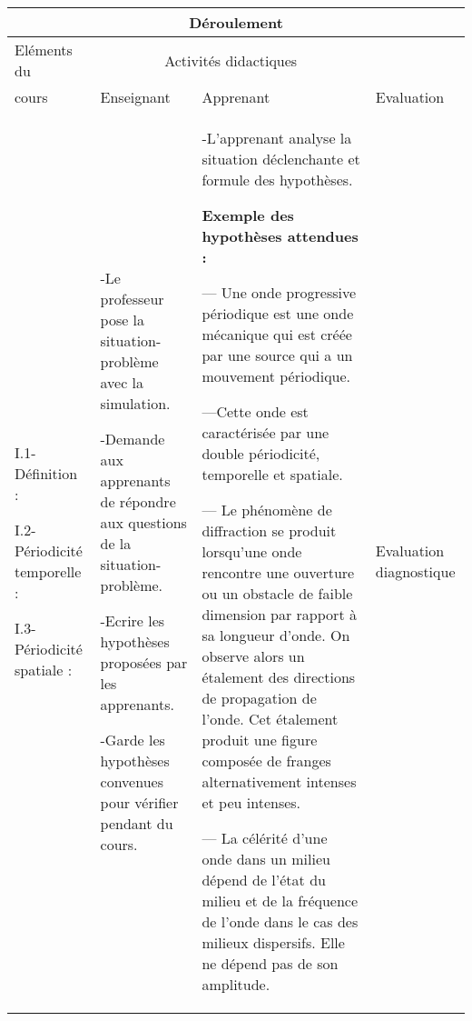 \documentclass[12pt]{article}
\begin{document}
\begin{center}
	 \begin{tabular}{|p{}||p{}||p{}||p{}|}
\hline
\multicolumn{4}{|c|}{Déroulement}\\\hline
Eléments du & \multicolumn{2}{c||}{Activités didactiques} &  \\\cline{2-3}
cours & Enseignant & Apprenant & Evaluation\\\hline

\color{red}{I- Notion d’onde mécanique progressive périodique}	 

\vspace{0.5cm}
\color{blue}I.1- Définition :
\vspace{0.5cm}

\color{blue}I.2- Périodicité temporelle :
\vspace{0.5cm}

\color{blue}I.3- Périodicité spatiale :
\vspace{0.5cm}

	  &
-Le professeur pose la situation-problème avec la simulation.

-Demande aux apprenants de répondre aux questions de la situation-problème.

-Ecrire les hypothèses proposées par les apprenants.

-Garde les hypothèses convenues pour vérifier pendant
du cours.
				  &
				  -L’apprenant analyse la situation déclenchante
et formule des hypothèses.

\textbf{Exemple des hypothèses attendues :}

--- Une onde progressive périodique est une onde mécanique qui est créée par une source qui a un mouvement périodique.

---Cette onde est caractérisée par une double périodicité, temporelle et spatiale.

--- Le phénomène de diffraction se produit lorsqu'une onde rencontre une ouverture ou un obstacle de faible dimension par rapport à sa longueur d'onde. On observe alors un étalement des directions de propagation de l'onde. Cet étalement produit une figure composée de franges alternativement intenses et peu intenses.

--- La célérité d'une onde dans un milieu dépend de l'état du milieu et de la fréquence de l'onde dans le cas des milieux dispersifs. Elle ne dépend pas de son amplitude.
				  &
				  Evaluation
diagnostique\\\hline



\end{tabular}
\end{center}
\end{document}
